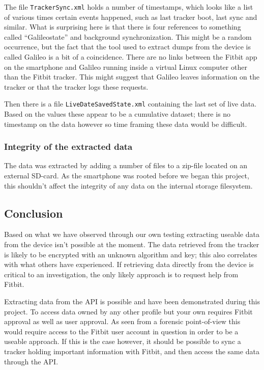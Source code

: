 \documentclass[a4paper,11pt,dvips]{article}
\begin{document}
The file \texttt{TrackerSync.xml} holds a number of timestamps, which looks like a list of various times certain events happened, such as last tracker boot, last sync and similar. What is surprising here is that there is four references to something called “Galileostate” and background synchronization. This might be a random occurrence, but the fact that the tool used to extract dumps from the device is called Galileo is a bit of a coincidence. There are no links between the Fitbit app on the smartphone and Galileo running inside a virtual Linux computer other than the Fitbit tracker. This might suggest that Galileo leaves information on the tracker or that the tracker logs these requests.

Then there is a file \texttt{LiveDateSavedState.xml} containing the last set of live data. Based on the values these appear to be a cumulative dataset; there is no timestamp on the data however so time framing these data would be difficult.

\subsubsection{Integrity of the extracted data}
The data was extracted by adding a number of files to a zip-file located on an external SD-card. As the smartphone was rooted before we began this project, this shouldn’t affect the integrity of any data on the internal storage filesystem.


\subsection{Conclusion}

Based on what we have observed through our own testing extracting useable data from the device isn’t possible at the moment. The data retrieved from the tracker is likely to be encrypted with an unknown algorithm and key; this also correlates with what others have experienced. If retrieving data directly from the device is critical to an investigation, the only likely approach is to request help from Fitbit.

Extracting data from the API is possible and have been demonstrated during this project. To access data owned by any other profile but your own requires Fitbit approval as well as user approval. As seen from a forensic point-of-view this would require access to the Fitbit user account in question in order to be a useable approach. If this is the case however, it should be possible to sync a tracker holding important information with Fitbit, and then access the same data through the API.
\end{document}
